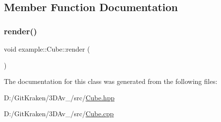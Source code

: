 \subsection{Member Function Documentation}
\mbox{\label{classexample_1_1_cube_a9f968872ab6a7ee0362e49a0c5f4e8b6}} 
\subsubsection{\texorpdfstring{render()}{render()}}
{\footnotesize\ttfamily void example\+::\+Cube\+::render (\begin{DoxyParamCaption}{ }\end{DoxyParamCaption})}



The documentation for this class was generated from the following files\+:\begin{DoxyCompactItemize}
\item 
D\+:/\+Git\+Kraken/3\+D\+Av\+\_/src/\mbox{\hyperlink{_cube_8hpp}{Cube.\+hpp}}\item 
D\+:/\+Git\+Kraken/3\+D\+Av\+\_/src/\mbox{\hyperlink{_cube_8cpp}{Cube.\+cpp}}\end{DoxyCompactItemize}
